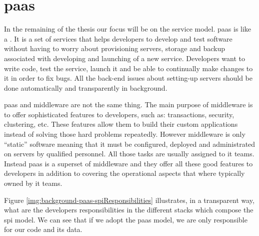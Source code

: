 %
%
\section{\acf{paas}}
\label{sec:background-paas}
In the remaining of the thesis our focus will be on the  service model.
\ac{paas} is like a . It is a set of services that helps developers
to develop and test software without having to worry about provisioning servers, storage and backup
associated with developing and launching of a new service. Developers want to write code, test the service,
launch it and be able to continually make changes to it in order to fix bugs. All the back-end issues about
setting-up servers should be done automatically and transparently in background.

\ac{paas} and middleware are not the same thing. The main purpose of middleware is to offer
sophisticated features to developers, such as: transactions, security, clustering, etc. These features
allow them to build their custom applications instead of solving those hard problems repeatedly.
However middleware is only ``static'' software meaning that it must be configured, deployed and
administrated on servers by qualified personnel. All those tasks are usually assigned to \acs{it} teams.
Instead \ac{paas} is a superset of middleware and they offer all these good features to developers
in addition to covering the operational aspects that where typically owned by \acs{it} teams.

Figure \ref{img:background-paas-spiResponsibilities} illustrates, in a transparent way, what are the
developers responsibilities in the different stacks which compose the \ac{spi} model. We can see that
if we adopt the \ac{paas} model, we are only responsible for our code and its data.


